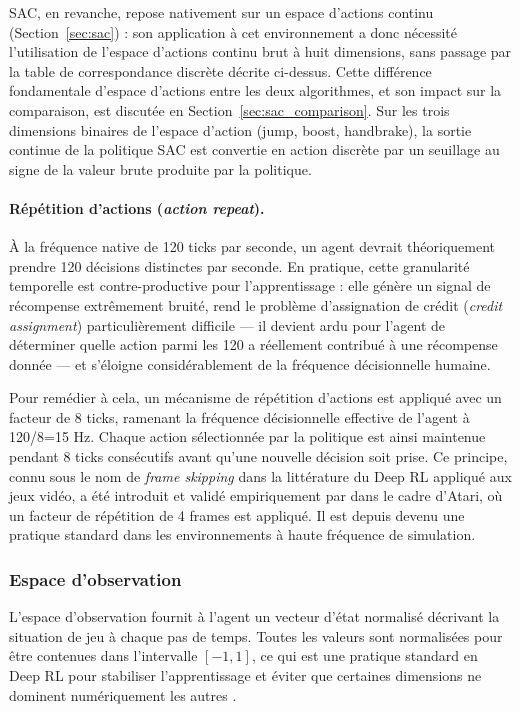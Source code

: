 SAC, en revanche, repose nativement sur un espace d'actions continu (Section~\ref{sec:sac}) : son application à cet environnement a donc nécessité l'utilisation de l'espace d'actions continu brut à huit dimensions, sans passage par la table de correspondance discrète décrite ci-dessus. Cette différence fondamentale d'espace d'actions entre les deux algorithmes, et son impact sur la comparaison, est discutée en Section~\ref{sec:sac_comparison}.
Sur les trois dimensions binaires de l'espace d'action (jump, boost, handbrake), la sortie continue de la politique SAC est convertie en action discrète par un seuillage au signe de la valeur brute produite par la politique.

\paragraph{Répétition d'actions (\textit{action repeat}).} 
À la fréquence native de 120 ticks par seconde, un agent devrait théoriquement prendre 120 décisions distinctes par seconde. En pratique, cette granularité temporelle est contre-productive pour l'apprentissage : elle génère un signal de récompense extrêmement bruité, rend le problème d'assignation de crédit (\textit{credit assignment}) particulièrement difficile — il devient ardu pour l'agent de déterminer quelle action parmi les 120 a réellement contribué à une récompense donnée — et s'éloigne considérablement de la fréquence décisionnelle humaine.

Pour remédier à cela, un mécanisme de répétition d'actions est appliqué avec un facteur de 8 ticks, ramenant la fréquence décisionnelle effective de l'agent à 120/8=15 Hz. Chaque action sélectionnée par la politique est ainsi maintenue pendant 8 ticks consécutifs avant qu'une nouvelle décision soit prise. Ce principe, connu sous le nom de \textit{frame skipping} dans la littérature du Deep RL appliqué aux jeux vidéo, a été introduit et validé empiriquement par \textcite{mnihHumanlevelControlDeep2015} dans le cadre d'Atari, où un facteur de répétition de 4 frames est appliqué. Il est depuis devenu une pratique standard dans les environnements à haute fréquence de simulation.

\subsubsection{Espace d'observation}
\label{sec:obs_space}

L'espace d'observation fournit à l'agent un vecteur d'état normalisé décrivant la situation de jeu à chaque pas de temps. Toutes les valeurs sont normalisées pour être contenues dans l'intervalle $[-1, 1]$, ce qui est une pratique standard en Deep RL pour stabiliser l'apprentissage et éviter que certaines dimensions ne dominent numériquement les autres \parencite{engstromImplementationMattersDeep2020, ReinforcementLearningTips}.

